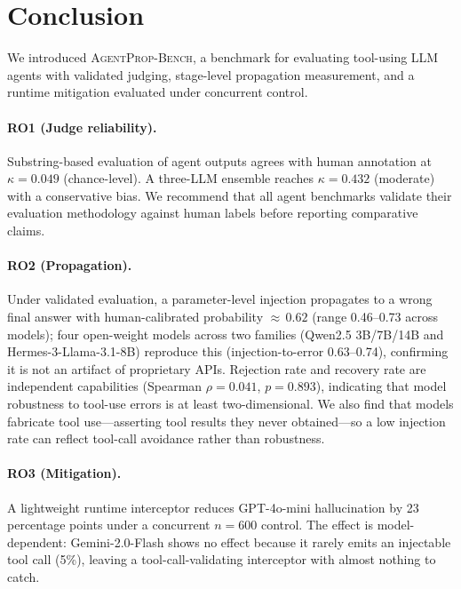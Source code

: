 \documentclass{article}
\newcommand{\bench}{\textsc{AgentProp-Bench}\xspace}
\begin{document}
\section{Conclusion}
\label{sec:conclusion}

We introduced \bench{}, a benchmark for evaluating tool-using LLM agents
with validated judging, stage-level propagation measurement, and a
runtime mitigation evaluated under concurrent control.

\paragraph{RO1 (Judge reliability).}
Substring-based evaluation of agent outputs agrees with human annotation
at $\kappa{=}0.049$ (chance-level).
A three-LLM ensemble reaches $\kappa{=}0.432$ (moderate) with a
conservative bias.
We recommend that all agent benchmarks validate their evaluation
methodology against human labels before reporting comparative claims.

\paragraph{RO2 (Propagation).}
Under validated evaluation, a parameter-level injection propagates to a
wrong final answer with human-calibrated probability ${\approx}\,0.62$
(range 0.46--0.73 across models); four open-weight models across two families
(Qwen2.5 3B/7B/14B and Hermes-3-Llama-3.1-8B) reproduce this (injection-to-error
0.63--0.74), confirming it is not an
artifact of proprietary APIs.
Rejection rate and recovery rate are independent capabilities
(Spearman $\rho{=}0.041$, $p{=}0.893$), indicating that model
robustness to tool-use errors is at least two-dimensional. We also find
that models fabricate tool use---asserting tool results they never
obtained---so a low injection rate can reflect tool-call avoidance rather
than robustness.

\paragraph{RO3 (Mitigation).}
A lightweight runtime interceptor reduces GPT-4o-mini hallucination by
23 percentage points under a concurrent $n{=}600$ control.
The effect is model-dependent: Gemini-2.0-Flash shows no effect because it
rarely emits an injectable tool call (5\%), leaving a tool-call-validating
interceptor with almost nothing to catch.
\end{document}
